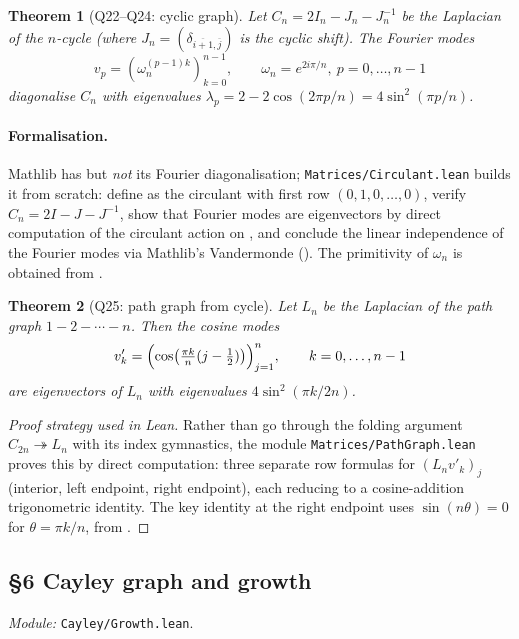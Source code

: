 \documentclass[11pt,a4paper]{article}
\newcommand{\lmod}[1]{\texttt{\small #1}}
\theoremstyle{plain}
\newtheorem{theorem}{Theorem}[section]
\theoremstyle{definition}
\begin{document}
\begin{theorem}[Q22--Q24: cyclic graph]
Let $C_n = 2 I_n - J_n - J_n^{-1}$ be the Laplacian of the $n$-cycle
(where $J_n = (\delta_{\overline{i+1}, \overline j})$ is the cyclic
shift). The Fourier modes
\[ v_p = (\omega_n^{(p-1)k})_{k=0}^{n-1}, \qquad
   \omega_n = e^{2i\pi/n},\ p = 0, \ldots, n-1 \]
diagonalise $C_n$ with eigenvalues
$\lambda_p = 2 - 2\cos(2\pi p / n) = 4\sin^2(\pi p/n)$.
\end{theorem}

\paragraph{Formalisation.}
Mathlib has  but \emph{not} its Fourier
diagonalisation; \lmod{Matrices/Circulant.lean} builds it from scratch:
define  as the circulant with first row $(0,1,0,\ldots,0)$,
verify $C_n = 2I - J - J^{-1}$, show that Fourier modes are eigenvectors
by direct computation of the circulant action on ,
and conclude the linear independence of the Fourier modes via Mathlib's
Vandermonde ().
The primitivity of $\omega_n$ is obtained from
.

\begin{theorem}[Q25: path graph from cycle]
Let $L_n$ be the Laplacian of the path graph $1{-}2{-}\cdots{-}n$. Then
the cosine modes
\[ v'_k = \Bigl(\cos\bigl(\tfrac{\pi k}{n}(j - \tfrac12)\bigr)\Bigr)_{j=1}^n,
   \qquad k = 0, \ldots, n-1 \]
are eigenvectors of $L_n$ with eigenvalues
$4\sin^2(\pi k / 2n)$.
\end{theorem}

\begin{proof}[Proof strategy used in Lean]
Rather than go through the folding argument
$C_{2n} \twoheadrightarrow L_n$ with its index gymnastics, the module
\lmod{Matrices/PathGraph.lean} proves this by direct computation:
three separate row formulas for $(L_n v'_k)_j$ (interior, left endpoint,
right endpoint), each reducing to a cosine-addition trigonometric
identity. The key identity at the right endpoint uses
$\sin(n \theta) = 0$ for $\theta = \pi k / n$, from
.
\end{proof}

\subsection{\S6 Cayley graph and growth}
\emph{Module:} \lmod{Cayley/Growth.lean}.
\end{document}
